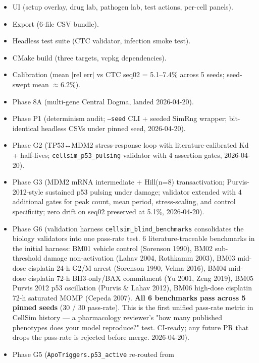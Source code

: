 \documentclass[11pt,letterpaper,twoside,openany]{book}
\newcommand{\code}[1]{\texttt{#1}}
\begin{document}
\begin{itemize}
  \item UI (setup overlay, drug lab, pathogen lab, test actions,
        per-cell panels).
  \item Export (6-file CSV bundle).
  \item Headless test suite (CTC validator, infection smoke test).
  \item CMake build (three targets, vcpkg dependencies).
  \item Calibration (mean $|$rel err$|$ vs CTC seq02 = 5.1--7.4\%
        across 5 seeds; seed-swept mean $\approx 6.2\%$).
  \item Phase 8A (multi-gene Central Dogma, landed 2026-04-20).
  \item Phase P1 (determinism audit; \code{--seed} CLI + seeded
        SimRng wrapper; bit-identical headless CSVs under pinned
        seed, 2026-04-20).
  \item Phase G2 (TP53↔MDM2 stress-response loop with
        literature-calibrated Kd + half-lives; \code{cellsim\_p53\_pulsing}
        validator with 4 assertion gates, 2026-04-20).
  \item Phase G3 (MDM2 mRNA intermediate + Hill(n=8) transactivation;
        Purvis-2012-style sustained p53 pulsing under damage;
        validator extended with 4 additional gates for peak count,
        mean period, stress-scaling, and control specificity;
        zero drift on seq02 preserved at 5.1\%, 2026-04-20).
  \item Phase G6 (validation harness \texttt{cellsim\_blind\_benchmarks}
        consolidates the biology validators into one pass-rate test.
        6 literature-traceable benchmarks in the initial harness:
        BM01 vehicle control (Sorenson 1990),
        BM02 sub-threshold damage non-activation (Lahav 2004, Rothkamm 2003),
        BM03 mid-dose cisplatin 24-h G2/M arrest (Sorenson 1990, Velma 2016),
        BM04 mid-dose cisplatin 72-h BH3-only/BAX commitment
              (Yu 2001, Zeng 2019),
        BM05 Purvis 2012 p53 oscillation (Purvis \& Lahav 2012),
        BM06 high-dose cisplatin 72-h saturated MOMP (Cepeda 2007).
        \textbf{All 6 benchmarks pass across 5 pinned seeds} (30 / 30
        pass-rate). This is the first unified pass-rate metric in
        CellSim history — a pharmacology reviewer's "how many
        published phenotypes does your model reproduce?" test.
        CI-ready; any future PR that drops the pass-rate is rejected
        before merge. 2026-04-20).
  \item Phase G5 (\texttt{ApoTriggers.p53\_active} re-routed from

\end{itemize}
\end{document}
